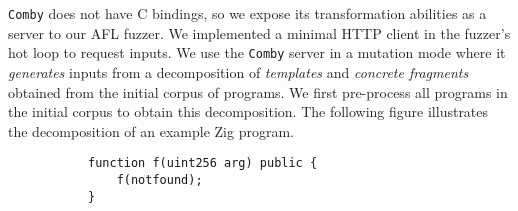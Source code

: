\texttt{Comby} does not have C bindings, so we expose its transformation
abilities as a server to our AFL fuzzer. We implemented a minimal HTTP client
in the fuzzer's hot loop to request inputs. We use the \texttt{Comby} server in
a mutation mode where it \emph{generates} inputs from a decomposition of
\emph{templates} and \emph{concrete fragments} obtained from the initial corpus
of programs. We first pre-process all programs in the initial corpus to obtain
this decomposition. The following figure illustrates the decomposition of an
example Zig program.

\begin{figure}[h!]
\begin{subfigure}{\columnwidth}
\begin{lstlisting}[basicstyle=\scriptsize\ttfamily,numbers=none,xleftmargin=1em,xrightmargin=14em]
function f(uint256 arg) public {
    f(notfound);
}
\end{lstlisting}
\vspace{-1em}
\end{subfigure}
\end{figure}

